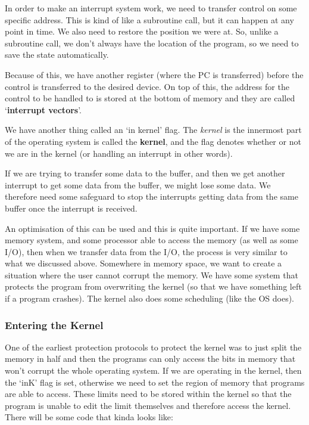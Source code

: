 \documentclass[11pt,a4paper,titlepage,dvipsnames,cmyk]{scrartcl}
\begin{document}
In order to make an interrupt system work, we need to transfer control on
some specific address. This is kind of like a subroutine call, but it can
happen at any point in time. We also need to restore the position we were
at. So, unlike a subroutine call, we don't always have the location of the
program, so we need to save the state automatically.

Because of this, we have another register (where the PC is transferred)
before the control is transferred to the desired device. On top of this,
the address for the control to be handled to is stored at the bottom of
memory and they are called `\textbf{interrupt vectors}'.

We have another thing called an `in kernel' flag. The \textit{kernel} is
the innermost part of the operating system is called the \textbf{kernel},
and the flag denotes whether or not we are in the kernel (or handling an
interrupt in other words).

If we are trying to transfer some data to the buffer, and then we get
another interrupt to get some data from the buffer, we might lose some
data. We therefore need some safeguard to stop the interrupts getting data
from the same buffer once the interrupt is received.

An optimisation of this can be used and this is quite important. If we
have some memory system, and some processor able to access the memory (as
well as some I/O), then when we transfer data from the I/O, the process is
very similar to what we discussed above. Somewhere in memory space, we
want to create a situation where the user cannot corrupt the memory. We
have some system that protects the program from overwriting the kernel (so
that we have something left if a program crashes). The kernel also does
some scheduling (like the OS does).

\subsubsection{Entering the Kernel}%
\label{ssub:entering-kernel}


One of the earliest protection protocols to protect the kernel was to just
split the memory in half and then the programs can only access the bits in
memory that won't corrupt the whole operating system. If we are operating
in the kernel, then the `inK' flag is set, otherwise we need to set the
region of memory that programs are able to access. These limits need to be
stored within the kernel so that the program is unable to edit the limit
themselves and therefore access the kernel. There will be some code that
kinda looks like:
\end{document}
